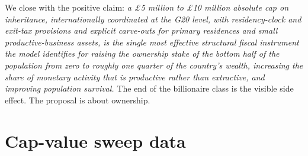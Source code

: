 \documentclass[11pt]{article}
\begin{document}
We close with the positive claim:
\emph{a \pounds 5 million to \pounds 10 million absolute cap on
inheritance, internationally coordinated at the G20 level, with
residency-clock and exit-tax provisions and explicit carve-outs
for primary residences and small productive-business assets, is
the single most effective structural fiscal instrument the model
identifies for raising the ownership stake of the bottom half of
the population from zero to roughly one quarter of the country's
wealth, increasing the share of monetary activity that is
productive rather than extractive, and improving population
survival.}  The end of the billionaire class is the visible side
effect.  The proposal is about ownership.




\appendix
\section{Cap-value sweep data}
\label{app:sweep}
\end{document}

